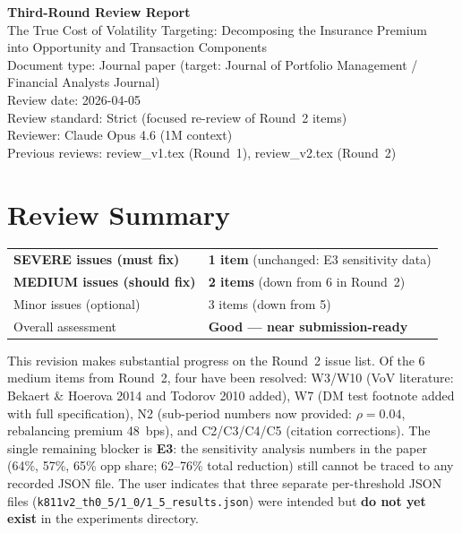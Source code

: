 \documentclass[12pt,a4paper]{article}
\begin{document}
\begin{center}
{\Large\bfseries Third-Round Review Report}\\[0.5em]
{\large The True Cost of Volatility Targeting: Decomposing the Insurance Premium\\into Opportunity and Transaction Components}\\[0.5em]
{\normalsize Document type: Journal paper (target: Journal of Portfolio Management / Financial Analysts Journal)}\\
{\normalsize Review date: 2026-04-05}\\
{\normalsize Review standard: Strict (focused re-review of Round~2 items)}\\
{\normalsize Reviewer: Claude Opus 4.6 (1M context)}\\[0.3em]
{\normalsize Previous reviews: review\_v1.tex (Round~1), review\_v2.tex (Round~2)}
\end{center}

\bigskip

\section*{Review Summary}

\begin{tabular}{ll}
\textcolor{errorred}{\textbf{SEVERE issues (must fix)}} & \textbf{1 item} (unchanged: E3 sensitivity data) \\
\textcolor{warncolor}{\textbf{MEDIUM issues (should fix)}} & \textbf{2 items} (down from 6 in Round~2) \\
Minor issues (optional) & 3 items (down from 5) \\
Overall assessment & \textbf{Good --- near submission-ready} \\
\end{tabular}

\bigskip

This revision makes substantial progress on the Round~2 issue list. Of the 6 medium items from Round~2, four have been resolved: W3/W10 (VoV literature: Bekaert \& Hoerova 2014 and Todorov 2010 added), W7 (DM test footnote added with full specification), N2 (sub-period numbers now provided: $\rho = 0.04$, rebalancing premium 48~bps), and C2/C3/C4/C5 (citation corrections). The single remaining blocker is \textbf{E3}: the sensitivity analysis numbers in the paper (64\%, 57\%, 65\% opp share; 62--76\% total reduction) still cannot be traced to any recorded JSON file. The user indicates that three separate per-threshold JSON files (\texttt{k811v2\_th0\_5/1\_0/1\_5\_results.json}) were intended but \textbf{do not yet exist} in the experiments directory.
\end{document}
